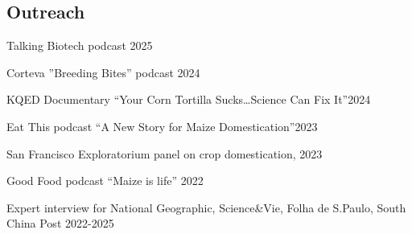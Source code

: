 \documentclass[letterpaper,10pt]{article}
\newcommand{\ignore}[1]{}
\renewenvironment{itemize}{
  \begin{list}{}{
    \setlength{\leftmargin}{1.5em}
  }
}{
  \end{list}
}
\begin{document}
\subsection*{Outreach}
\begin{itemize}
  \setlength\itemsep{0ex}
\item Talking Biotech podcast \hfill 2025
\item Corteva ''Breeding Bites'' podcast \hfill 2024
\item KQED Documentary ``Your Corn Tortilla Sucks…Science Can Fix It''\hfill 2024
\item Eat This podcast ``A New Story for Maize Domestication''\hfill 2023
\item San Francisco Exploratorium panel on crop domestication, \hfill 2023
\item Good Food podcast ``Maize is life'' \hfill 2022
\item Expert interview for \ignore{2024} National Geographic, \ignore{2023} Science\&Vie, \ignore{2023} Folha de S.Paulo, \newline \ignore{2023} South China Post \hfill 2022-2025
\end{itemize}

\end{document}
